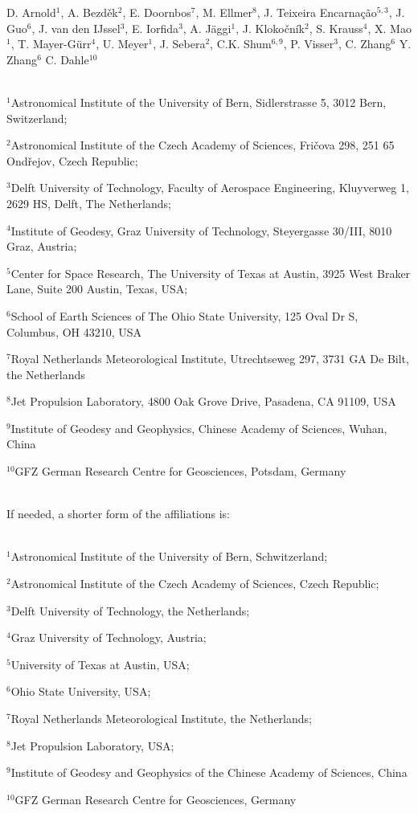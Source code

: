 \documentclass[11pt,a4paper,oneside]{article}
\begin{document}
D. Arnold$^1$, %
A. Bezd\v{e}k$^2$, %
E. Doornbos$^7$, %
M. Ellmer$^8$, %
J. Teixeira Encarna\c c\~ao$^{5,3}$, %
J. Guo$^6$, %
J. van den IJssel$^3$, %
E. Iorfida$^3$, %
A. J\"{a}ggi$^1$, %
J. Kloko\v{c}n\'{i}k$^2$, %
S. Krauss$^4$,
X. Mao$^1$, %
T. Mayer-G\"{u}rr$^4$, %
U. Meyer$^1$, %
J. Sebera$^2$, %
C.K. Shum$^{6,9}$, %
P. Visser$^3$, %
C. Zhang$^6$ %
Y. Zhang$^6$
C. Dahle$^{10}$

~\\

$^1$Astronomical Institute of the University of Bern, Sidlerstrasse 5, 3012 Bern, Switzerland;

$^2$Astronomical Institute of the Czech Academy of Sciences, Fri\v{c}ova 298, 251 65 Ond\v{r}ejov, Czech Republic;

$^3$Delft University of Technology, Faculty of Aerospace Engineering, Kluyverweg 1, 2629 HS, Delft, The Netherlands;

$^4$Institute of Geodesy, Graz University of Technology, Steyergasse 30/III, 8010 Graz, Austria;

$^5$Center for Space Research, The University of Texas at Austin, 3925 West Braker Lane, Suite 200 Austin, Texas, USA;

$^6$School of Earth Sciences of The Ohio State University, 125 Oval Dr S, Columbus, OH 43210, USA

$^7$Royal Netherlands Meteorological Institute, Utrechtseweg 297, 3731 GA De Bilt, the Netherlands

$^8$Jet Propulsion Laboratory, 4800 Oak Grove Drive, Pasadena, CA 91109, USA

$^9$Institute of Geodesy and Geophysics, Chinese Academy of Sciences, Wuhan, China

$^{10}$GFZ German Research Centre for Geosciences, Potsdam, Germany

~\\

If needed, a shorter form of the affiliations is:

~\\

$^1$Astronomical Institute of the University of Bern, Schwitzerland;

$^2$Astronomical Institute of the Czech Academy of Sciences, Czech Republic;

$^3$Delft University of Technology, the Netherlands;

$^4$Graz University of Technology, Austria;

$^5$University of Texas at Austin, USA;

$^6$Ohio State University, USA;

$^7$Royal Netherlands Meteorological Institute, the Netherlands;

$^8$Jet Propulsion Laboratory, USA;

$^9$Institute of Geodesy and Geophysics of the Chinese Academy of Sciences, China

$^{10}$GFZ German Research Centre for Geosciences, Germany
\end{document}
